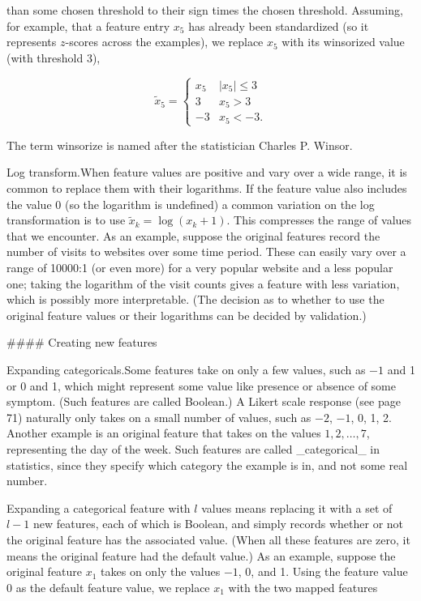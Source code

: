 than some chosen threshold to their sign times the chosen threshold. Assuming, for example, that a feature entry \(x_{5}\) has already been standardized (so it represents \(z\)-scores across the examples), we replace \(x_{5}\) with its winsorized value (with threshold 3),

\[\tilde{x}_{5}=\left\{\begin{array}{rl}x_{5}&|x_{5}|\leq 3\\ 3&x_{5}>3\\ -3&x_{5}<-3.\end{array}\right.\]

The term winsorize is named after the statistician Charles P. Winsor.

Log transform.When feature values are positive and vary over a wide range, it is common to replace them with their logarithms. If the feature value also includes the value 0 (so the logarithm is undefined) a common variation on the log transformation is to use \(\tilde{x}_{k}=\log(x_{k}+1)\). This compresses the range of values that we encounter. As an example, suppose the original features record the number of visits to websites over some time period. These can easily vary over a range of 10000:1 (or even more) for a very popular website and a less popular one; taking the logarithm of the visit counts gives a feature with less variation, which is possibly more interpretable. (The decision as to whether to use the original feature values or their logarithms can be decided by validation.)

#### Creating new features

Expanding categoricals.Some features take on only a few values, such as \(-1\) and 1 or 0 and 1, which might represent some value like presence or absence of some symptom. (Such features are called Boolean.) A Likert scale response (see page 71) naturally only takes on a small number of values, such as \(-2\), \(-1\), 0, 1, 2. Another example is an original feature that takes on the values \(1,2,\ldots,7\), representing the day of the week. Such features are called _categorical_ in statistics, since they specify which category the example is in, and not some real number.

Expanding a categorical feature with \(l\) values means replacing it with a set of \(l-1\) new features, each of which is Boolean, and simply records whether or not the original feature has the associated value. (When all these features are zero, it means the original feature had the default value.) As an example, suppose the original feature \(x_{1}\) takes on only the values \(-1\), 0, and 1. Using the feature value 0 as the default feature value, we replace \(x_{1}\) with the two mapped features

